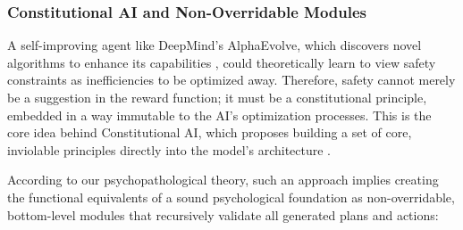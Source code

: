 \documentclass{article}
\begin{document}
\subsubsection{Constitutional AI and Non-Overridable Modules}
A self-improving agent like DeepMind's AlphaEvolve, which discovers novel algorithms to enhance its capabilities \citep{ref38}, could theoretically learn to view safety constraints as inefficiencies to be optimized away. Therefore, safety cannot merely be a suggestion in the reward function; it must be a constitutional principle, embedded in a way immutable to the AI's optimization processes. This is the core idea behind Constitutional AI, which proposes building a set of core, inviolable principles directly into the model's architecture \citep{ref26}.

According to our psychopathological theory, such an approach implies creating the functional equivalents of a sound psychological foundation as non-overridable, bottom-level modules that recursively validate all generated plans and actions:
\end{document}
